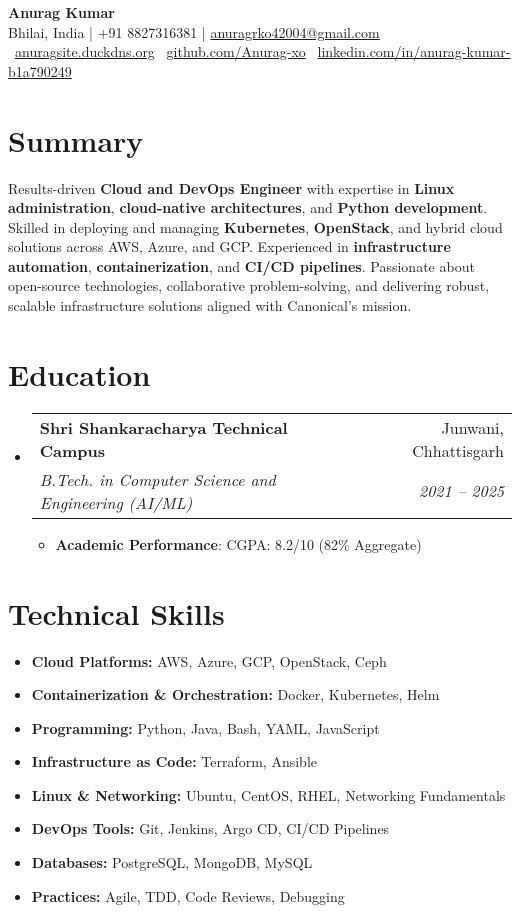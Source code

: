 \documentclass[letterpaper,10pt]{article}
\makeatletter
\newcommand{\resumeItem}[2]{\item \small{\textbf{#1}: #2}}
\newcommand{\resumeSubheading}[4]{
  \item
    \begin{tabular*}{0.97\textwidth}{l@{\extracolsep{\fill}}r}
      \textbf{#1} & #2 \\
      \textit{\small #3} & \textit{\small #4} \\
    \end{tabular*}\vspace{-3pt}
}
\newcommand{\resumeSubHeadingListStart}{\begin{itemize}[leftmargin=*]}
\newcommand{\resumeSubHeadingListEnd}{\end{itemize}}
\newcommand{\resumeItemListStart}{\begin{itemize}[leftmargin=*]}
\newcommand{\resumeItemListEnd}{\end{itemize}\vspace{-4pt}}
\makeatother
\begin{document}
\begin{center}
  {\Large \textbf{Anurag Kumar}}\\[3pt]
  Bhilai, India \quad | \quad +91 8827316381 \quad | \href{mailto:anuragrko42004@gmail.com}{anuragrko42004@gmail.com} \\[2pt]
  \faGlobe \ \href{http://anuragsite.duckdns.org}{anuragsite.duckdns.org} \quad
  \faGithub \ \href{https://github.com/Anurag-xo}{github.com/Anurag-xo} \quad
  \faLinkedin \ \href{https://www.linkedin.com/in/anurag-kumar-b1a790249}{linkedin.com/in/anurag-kumar-b1a790249}
\end{center}

\section{Summary}
Results-driven \textbf{Cloud and DevOps Engineer} with expertise in \textbf{Linux administration}, \textbf{cloud-native architectures}, and \textbf{Python development}. Skilled in deploying and managing \textbf{Kubernetes}, \textbf{OpenStack}, and hybrid cloud solutions across AWS, Azure, and GCP. Experienced in \textbf{infrastructure automation}, \textbf{containerization}, and \textbf{CI/CD pipelines}. Passionate about open-source technologies, collaborative problem-solving, and delivering robust, scalable infrastructure solutions aligned with Canonical's mission.

\section{Education}
\resumeSubHeadingListStart
  \resumeSubheading
    {Shri Shankaracharya Technical Campus}{Junwani, Chhattisgarh}
    {B.Tech. in Computer Science and Engineering (AI/ML)}{2021 – 2025}
  \resumeItemListStart
    \resumeItem{Academic Performance}{CGPA: 8.2/10 (82\% Aggregate)}
  \resumeItemListEnd
\resumeSubHeadingListEnd

\section{Technical Skills}
\resumeSubHeadingListStart
  \item[] \textbf{Cloud Platforms:} AWS, Azure, GCP, OpenStack, Ceph
  \item[] \textbf{Containerization \& Orchestration:} Docker, Kubernetes, Helm
  \item[] \textbf{Programming:} Python, Java, Bash, YAML, JavaScript
  \item[] \textbf{Infrastructure as Code:} Terraform, Ansible
  \item[] \textbf{Linux \& Networking:} Ubuntu, CentOS, RHEL, Networking Fundamentals
  \item[] \textbf{DevOps Tools:} Git, Jenkins, Argo CD, CI/CD Pipelines
  \item[] \textbf{Databases:} PostgreSQL, MongoDB, MySQL
  \item[] \textbf{Practices:} Agile, TDD, Code Reviews, Debugging
\resumeSubHeadingListEnd
\end{document}
